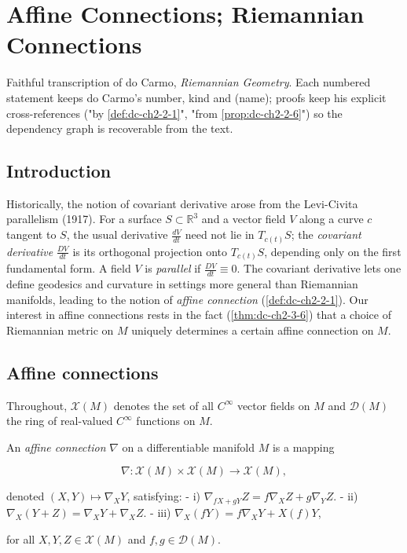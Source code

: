 \chapter{Affine Connections; Riemannian Connections}
\label{chap:dc-affine-connections-riemannian-connections}

Faithful transcription of do Carmo, \emph{Riemannian Geometry}. Each numbered
statement keeps do Carmo's number, kind and (name); proofs keep his explicit
cross-references ("by \cref{def:dc-ch2-2-1}", "from \cref{prop:dc-ch2-2-6}") so the dependency
graph is recoverable from the text.

\section{Introduction}

Historically, the notion of covariant derivative arose from the Levi-Civita
parallelism (1917). For a surface $S\subset\mathbb{R}^3$ and a vector field $V$
along a curve $c$ tangent to $S$, the usual derivative $\frac{dV}{dt}$ need not
lie in $T_{c(t)}S$; the \emph{covariant derivative} $\frac{DV}{dt}$ is its orthogonal
projection onto $T_{c(t)}S$, depending only on the first fundamental form. A
field $V$ is \emph{parallel} if $\frac{DV}{dt}\equiv 0$. The covariant derivative lets
one define geodesics and curvature in settings more general than Riemannian
manifolds, leading to the notion of \emph{affine connection} (\cref{def:dc-ch2-2-1}). Our
interest in affine connections rests in the fact (\cref{thm:dc-ch2-3-6}) that a choice of
Riemannian metric on $M$ uniquely determines a certain affine connection on $M$.

\section{Affine connections}

Throughout, $\mathcal{X}(M)$ denotes the set of all $C^\infty$ vector fields on
$M$ and $\mathcal{D}(M)$ the ring of real-valued $C^\infty$ functions on $M$.

\begin{definition}
  \label{def:dc-ch2-2-1}
  \leanok
  An \emph{affine connection} $\nabla$ on a differentiable manifold $M$ is a mapping
  
  $$
  \nabla:\mathcal{X}(M)\times\mathcal{X}(M)\to\mathcal{X}(M),
  $$
  
  denoted $(X,Y)\mapsto\nabla_X Y$, satisfying:
  - i) $\nabla_{fX+gY}Z = f\nabla_X Z + g\nabla_Y Z$.
  - ii) $\nabla_X(Y+Z)=\nabla_X Y+\nabla_X Z$.
  - iii) $\nabla_X(fY)=f\nabla_X Y + X(f)Y$,
  
  for all $X,Y,Z\in\mathcal{X}(M)$ and $f,g\in\mathcal{D}(M)$.
\end{definition}

